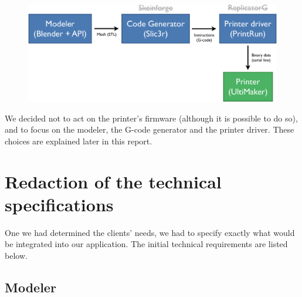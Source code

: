 \documentclass{report}
\begin{document}
\bigskip

\begin{figure}[!h]

\begin{center}
	\includegraphics[width=.7\textwidth]{schema}
\end{center}

\end{figure}

We decided not to act on the printer's firmware (although it is possible to do so), and to focus on the modeler, the G-code generator and the printer driver. These choices are explained later in this report. 

\section{Redaction of the technical specifications}

One we had determined the clients' needs, we had to specify exactly what would be integrated into our application. The initial technical requirements are listed below.

\subsection{Modeler}

\bigskip
\end{document}
